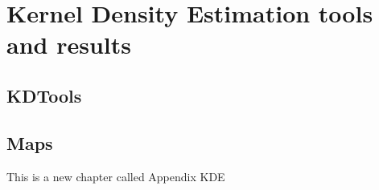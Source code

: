 \chapter{Kernel Density Estimation tools and results}
\section{KDTools}
\section{Maps}
This is a new chapter called Appendix KDE
